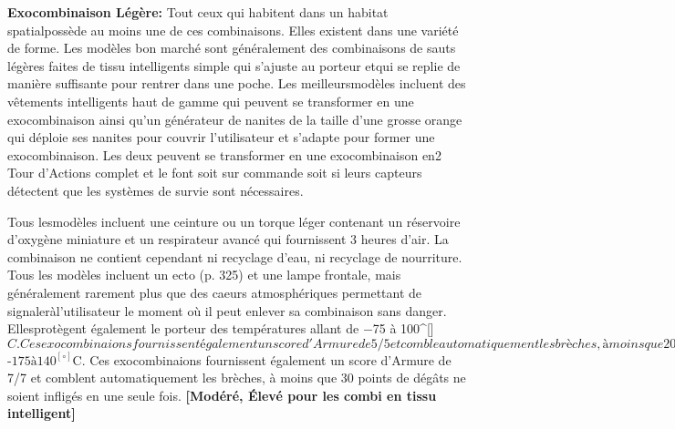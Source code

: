 \textbf{Exocombinaison Légère:} Tout ceux qui habitent dans un habitat spatialpossède au moins une de ces combinaisons. Elles existent dans une variété de forme. Les modèles bon marché sont généralement des combinaisons de sauts légères faites de tissu intelligents simple qui s'ajuste au porteur etqui se replie de manière suffisante pour rentrer dans une poche. Les meilleursmodèles incluent des vêtements intelligents haut de gamme qui peuvent se transformer en une exocombinaison ainsi qu'un générateur de nanites de la taille d'une grosse orange qui déploie ses nanites pour couvrir l'utilisateur et s'adapte pour former une exocombinaison. Les deux peuvent se transformer en une exocombinaison en2 Tour d'Actions complet et le font soit sur commande soit si leurs capteurs détectent que les systèmes de survie sont nécessaires. 

Tous lesmodèles incluent une ceinture ou un torque léger contenant un réservoire d'oxygène miniature et un respirateur avancé qui fournissent 3 heures d'air. La combinaison ne contient cependant ni recyclage d'eau, ni recyclage de nourriture. Tous les modèles incluent un ecto (p. 325) et une lampe frontale, mais généralement rarement plus que des caeurs atmosphériques permettant de signaleràl'utilisateur le moment où il peut enlever sa combinaison sans danger. Ellesprotègent également le porteur des températures allant de $-$75 à 100^[\circ]$C. Ces exocombinaions fournissent également un score d'Armure de 5/5 et comble automatiquement les brèches,àmoins que 20 points de dégâts ne soient infligés en une seule fois. \textbf{[Bas, Modéré pour les combi en tissu intelligent]} 

\textbf{Exocombinaison Standard:} Ces combinaisons ressemblent à des exocombi légère faites dans des matériaux plus épais et plus résistant, qui résistent à l'arrachage et qui fournissent une armure légère au porteur. Elles sont équippés avec des ceintures de survie plus substantielleet qui incluent un faiseur (p. 327) capable de recycler tous les déchets et de produire 48 heures d'air ainsi que de l'eau et de la nourriture indéfiniment. Les meilleures combinaisons sont faites de matériaux intelligents qui peuvent se transformer de vâtements standard à une exocombinaison en un seul Tourd'Action, et le feront automatiquement si des systèmes de survie sont nécessaires. Tous les modèles incluent un ecto (p. 325), un booster radio (p. 313), et des capteurs équivalents à des specs (see p. 325). Elles protègent également le porteur des températures allant de $-$175 à 140^[\circ]$C. Ces exocombinaions fournissent également un score d'Armure de 7/7 et comblent automatiquement les brèches, à moins que 30 points de dégâts ne soient infligés en une seule fois. \textbf{[Modéré, Élevé pour les combi en tissu intelligent]} 

